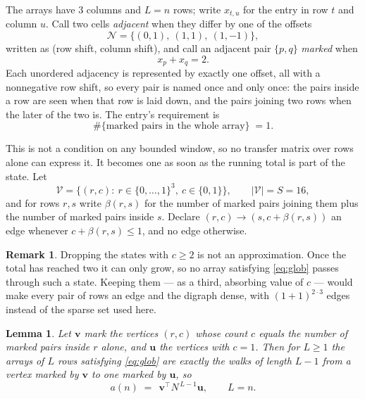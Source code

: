 \documentclass[11pt,a4paper]{article}
\theoremstyle{plain}
\newtheorem{lemma}[theorem]{Lemma}
\theoremstyle{definition}
\newtheorem{remark}[theorem]{Remark}
\begin{document}
The arrays have $3$ columns and $L=n$ rows; write $x_{t,u}$ for the entry in
row $t$ and column $u$. Call two cells \emph{adjacent} when they differ by one of the
offsets
\[
\mathcal N=\{(0,1),\ (1,1),\ (1,-1)\},
\]
written as (row shift, column shift), and call an adjacent pair $\{p,q\}$
\emph{marked} when
\[
x_{p}+x_{q}=2 .
\]
Each unordered adjacency is represented by exactly one offset, all with a nonnegative row
shift, so every pair is named once and only once: the pairs inside a row are seen when
that row is laid down, and the pairs joining two rows when the later of the two is. The
entry's requirement is
\begin{equation}\label{eq:glob}
\#\{\text{marked pairs in the whole array}\}\;=1.
\end{equation}

This is not a condition on any bounded window, so no transfer matrix over rows alone can
express it. It becomes one as soon as the running total is part of the state. Let
\[
\mathcal V=\bigl\{(r,c):\ r\in\{0,\dots,1\}^{3},\ c\in\{0,1\}\bigr\},
\qquad |\mathcal V|=S=16,
\]
and for rows $r,s$ write $\beta(r,s)$ for the number of marked pairs joining them plus the
number of marked pairs inside $s$. Declare $(r,c)\to(s,c+\beta(r,s))$ an edge whenever
$c+\beta(r,s)\le1$, and no edge otherwise.

\begin{remark}
Dropping the states with $c\ge2$ is not an approximation. Once the total has reached two it
can only grow, so no array satisfying \eqref{eq:glob} passes through such a state. Keeping
them --- as a third, absorbing value of $c$ --- would make every pair of rows an edge and
the digraph dense, with $(1+1)^{2\cdot3}$ edges instead of the sparse set used here.
\end{remark}

\begin{lemma}\label{lem:walk}
Let $\mathbf{v}$ mark the vertices $(r,c)$ whose count $c$ equals the number of marked pairs
inside $r$ alone, and $\mathbf{u}$ the vertices with $c=1$. Then for $L\ge1$ the arrays
of $L$ rows satisfying \eqref{eq:glob} are exactly the walks of length $L-1$ from a
vertex marked by $\mathbf{v}$ to one marked by $\mathbf{u}$, so
\[
a(n)\;=\;\,\mathbf{v}^{\!\top}N^{\,L-1}\mathbf{u},\qquad L=n .
\]
\end{lemma}
\end{document}

